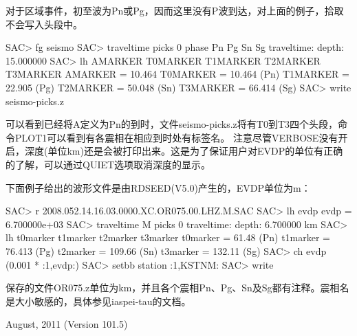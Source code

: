 对于区域事件，初至波为Pn或Pg，因而这里没有P波到达，对上面的例子，拾取不会写入头段中。
\begin{SACCode}
SAC> fg seismo
SAC>  traveltime picks 0 phase Pn Pg Sn Sg
traveltime: depth: 15.000000
SAC> lh AMARKER T0MARKER T1MARKER T2MARKER T3MARKER
AMARKER = 10.464                     
T0MARKER = 10.464           (Pn)
T1MARKER = 22.905           (Pg)
T2MARKER = 50.048           (Sn)
T3MARKER = 66.414           (Sg)
SAC> write seismo-picks.z
\end{SACCode}
可以看到已经将A定义为Pn的到时，文件seismo-picks.z将有T0到T3四个头段，命令PLOT1可以看到有各震相在相应到时处有标签名。
注意尽管VERBOSE没有开启，深度(单位km)还是会被打印出来。这是为了保证用户对EVDP的单位有正确的了解，可以通过QUIET选项取消深度的显示。

下面例子给出的波形文件是由RDSEED(V5.0)产生的，EVDP单位为m：
\begin{SACCode}
SAC> r 2008.052.14.16.03.0000.XC.OR075.00.LHZ.M.SAC
SAC> lh evdp
evdp = 6.700000e+03
SAC> traveltime M picks 0
traveltime: depth: 6.700000 km
SAC> lh t0marker t1marker t2marker t3marker
t0marker = 61.48            (Pn)        
t1marker = 76.413           (Pg)
t2marker = 109.66           (Sn)  
t3marker = 132.11           (Sg)
SAC> ch evdp (0.001 * :1,evdp:)
SAC> setbb station :1,KSTNM:
SAC> write %
\end{SACCode}
保存的文件OR075.z单位为km，并且各个震相Pn、Pg、Sn及Sg都有注释。震相名是大小敏感的，具体参见iaspei-tau的文档。

August, 2011 (Version 101.5)
